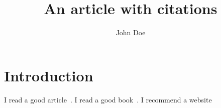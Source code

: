 \documentclass{article}
\title{An article with citations}
\author{John Doe}
\date{}
\begin{document}
\maketitle
\section{Introduction}
I read a good article~\cite{doe2020}.
I read a good book~\cite{bond2019}.
I recommend a website~\cite{black2013}



\end{document}
